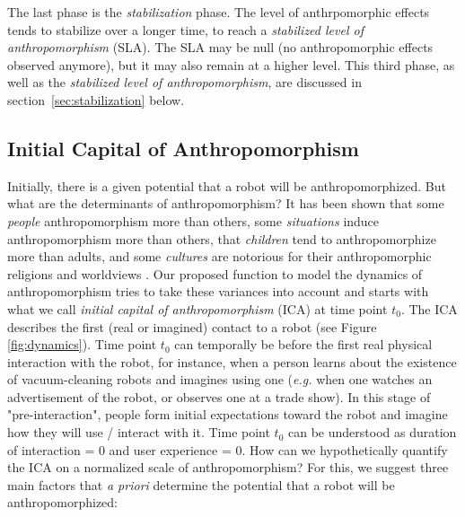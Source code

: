 \documentclass[lettersize, apacite, twoside, HRI]{apa_HRI}
\begin{document}
The last phase is the \emph{stabilization} phase. The level of anthrpomorphic
effects tends to stabilize over a longer time, to reach a \emph{stabilized
level of anthropomorphism} (SLA). The SLA may be null (no anthropomorphic
effects observed anymore), but it may also remain at a higher level.  This
third phase, as well as the \emph{stabilized level of anthropomorphism}, are
discussed in section~\ref{sec:stabilization} below.


\subsection{Initial Capital of Anthropomorphism}
\label{sec:ica}

	Initially, there is a given potential that a robot will be anthropomorphized. But what are the determinants of anthropomorphism? It has been shown that some \textit{people} anthropomorphism more than others, some \textit{situations} induce anthropomorphism more than others, that \textit{children} tend to anthropomorphize more than adults, and some \textit{cultures} are notorious for their anthropomorphic religions and worldviews \cite{epley_when_2008}. Our proposed function to model the dynamics of anthropomorphism tries to take these variances into account and starts with what we call \textit{initial capital of anthropomorphism} (ICA) at time point $t_{0}$. The ICA describes the first (real or imagined) contact to a robot (see Figure \ref{fig:dynamics}). Time point $t_{0}$ can temporally be before the first real physical interaction with the robot, for instance, when a person learns about the existence of vacuum-cleaning robots and imagines using one (\textit{e.g.} when one watches an advertisement of the robot, or observes one at a trade show). In this stage of "pre-interaction", people form initial expectations toward the robot and imagine how they will use / interact with it. Time point $t_{0}$ can be understood as duration of interaction = 0 and user experience = 0. How can we hypothetically quantify the ICA on a normalized scale of anthropomorphism? For this, we suggest three main factors that \textit{a priori} determine the potential that a robot will be anthropomorphized:
	
\end{document}
